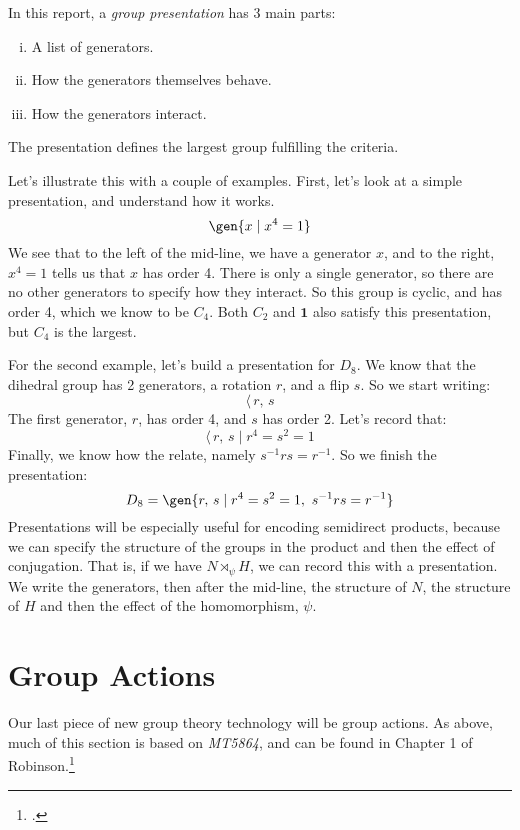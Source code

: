 \begin{definition}[Informal]
    In this report, a \emph{group presentation} has 3 main parts:
    \begin{enumerate}[(i)]
        \item A list of generators.
        \item How the generators themselves behave.
        \item How the generators interact.
    \end{enumerate}
    The presentation defines the largest group fulfilling the criteria.
\end{definition}

Let's illustrate this with a couple of examples.
First, let's look at a simple presentation, and understand how it works.
\[
    \gen{x \mid x^4 = 1}
\]
We see that to the left of the mid-line, we have a generator \(x\), and to the right, \(x^4 = 1\) tells us that \(x\)
has order 4.
There is only a single generator, so there are no other generators to specify how they interact.
So this group is cyclic, and has order 4, which we know to be \(C_4\).
Both \(C_2\) and \(\bm{1}\) also satisfy this presentation, but \(C_4\) is the largest.

For the second example, let's build a presentation for \(D_8\).
We know that the dihedral group has 2 generators, a rotation \(r\), and a flip \(s\).
So we start writing:
\[
    \langle\, r,\,s
\]
The first generator, \(r\), has order 4, and \(s\) has order 2.
Let's record that:
\[
    \langle\, r,\,s \mid r^4 = s^2 = 1
\]
Finally, we know how the relate, namely \(s^{-1} rs = r^{-1}\).
So we finish the presentation:
\[
    D_8 = \gen{r,\,s \mid r^4 = s^2 = 1,\ s^{-1}rs = r^{-1}}
\]
Presentations will be especially useful for encoding semidirect products, because we can specify the structure of the
groups in the product and then the effect of conjugation.
That is, if we have \(N \rtimes_\psi H\), we can record this with a presentation.
We write the generators, then after the mid-line, the structure of \(N\), the structure of \(H\) and then the effect of
the homomorphism, \(\psi\).

\section{Group Actions}
Our last piece of new group theory technology will be group actions.
As above, much of this section is based on \textit{MT5864}, and can be found in Chapter 1 of Robinson.\footcite{robinson1982}

